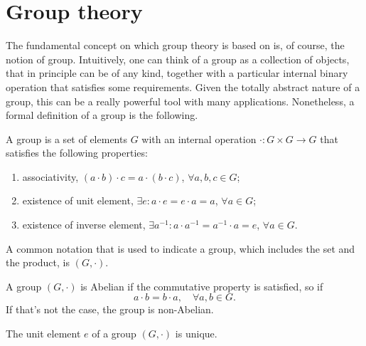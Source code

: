 \chapter{Group theory}
The fundamental concept on which group theory is based on is, of course, the notion of group. Intuitively, one can think of a group as a collection of objects, that in principle can be of any kind, together with a particular internal binary operation that satisfies some requirements. Given the totally abstract nature of a group, this can be a really powerful tool with many applications. Nonetheless, a formal definition of a group is the following.
\begin{defn}[group]
    A group is a set of elements $G$ with an internal operation $\cdot : G \times G \to G$ that satisfies the following properties:
    \begin{enumerate}
        \item associativity, $(a \cdot b)\cdot c = a\cdot(b \cdot c)$, $\forall a,b,c\in G$;
        \item existence of unit element, $\exists e : a \cdot e = e \cdot a = a$, $\forall a\in G$;
        \item existence of inverse element, $\exists a^{-1} : a\cdot a^{-1} = a^{-1} \cdot a = e$, $\forall a \in G$.
    \end{enumerate}
\end{defn}
\begin{notz}
    A common notation that is used to indicate a group, which includes the set and the product, is $(G,\cdot)$. 
\end{notz}
\begin{defn}
    A group $(G,\cdot)$ is Abelian if the commutative property is satisfied, so if
    \begin{equation}
        a \cdot b = b \cdot a,\quad \forall a,b \in G.
    \end{equation}
    If that's not the case, the group is non-Abelian.
\end{defn}
\begin{corl}
    The unit element $e$ of a group $(G,\cdot)$ is unique.
\end{corl}
